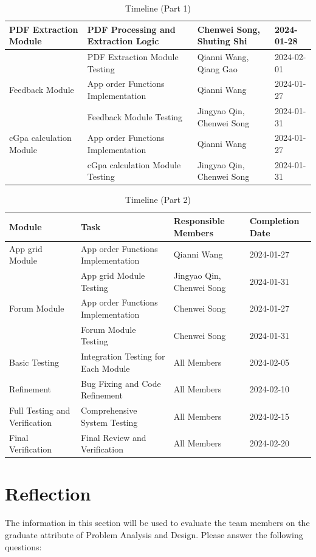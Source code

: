 \documentclass[12pt, titlepage]{article}
\begin{document}
\begin{table}[H]
\begin{tabular}{|p{}|p{}|p{}|p{}|}
\hline
PDF Extraction Module & PDF Processing and Extraction Logic & Chenwei Song, Shuting Shi & 2024-01-28 \\
\hline
 & PDF Extraction Module Testing & Qianni Wang, Qiang Gao & 2024-02-01 \\
\hline
Feedback Module & App order Functions Implementation & Qianni Wang & 2024-01-27 \\
\hline
 & Feedback Module Testing & Jingyao Qin, Chenwei Song & 2024-01-31 \\
\hline
cGpa calculation Module & App order Functions Implementation & Qianni Wang & 2024-01-27 \\
\hline
 & cGpa calculation Module Testing & Jingyao Qin, Chenwei Song & 2024-01-31 \\
\hline
\end{tabular}
\caption{Timeline (Part 1)}
\label{table:timeline1}
\end{table}
\newpage 

\begin{table}[H]
\centering
\begin{tabular}{|p{}|p{}|p{}|p{}|}
\hline
\textbf{Module} & \textbf{Task} & \textbf{Responsible Members} & \textbf{Completion Date} \\
\hline
App grid Module & App order Functions Implementation & Qianni Wang & 2024-01-27 \\
\hline
 & App grid Module Testing & Jingyao Qin, Chenwei Song & 2024-01-31 \\
\hline
Forum Module & App order Functions Implementation & Chenwei Song & 2024-01-27 \\
\hline
 & Forum Module Testing &Chenwei Song & 2024-01-31 \\
\hline
Basic Testing & Integration Testing for Each Module & All Members & 2024-02-05 \\
\hline
Refinement & Bug Fixing and Code Refinement & All Members & 2024-02-10 \\
\hline
Full Testing and Verification & Comprehensive System Testing & All Members & 2024-02-15 \\
\hline
Final Verification & Final Review and Verification & All Members & 2024-02-20 \\
\hline
\end{tabular}
\caption{Timeline (Part 2)}
\label{table:timeline2}
\end{table}




\section{Reflection}
The information in this section will be used to evaluate the team members on the
graduate attribute of Problem Analysis and Design.  Please answer the following questions:
\end{document}
